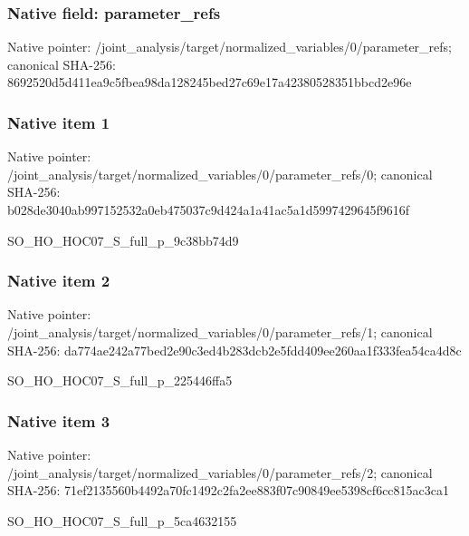 \documentclass[10pt,a4paper]{article}
\begin{document}
\subsubsection{Native field: parameter\_\allowbreak{}refs}
Native pointer: /joint\_\allowbreak{}analysis/target/normalized\_\allowbreak{}variables/0/parameter\_\allowbreak{}refs; canonical SHA-256: 8692520d5d411ea9c5fbea98da128245bed27c69e17a42380528351bbcd2e96e

\subsubsection{Native item 1}
Native pointer: /joint\_\allowbreak{}analysis/target/normalized\_\allowbreak{}variables/0/parameter\_\allowbreak{}refs/0; canonical SHA-256: b028de3040ab997152532a0eb475037c9d424a1a41ac5a1d5997429645f9616f

\begingroup\raggedright\sloppy SO\_\allowbreak{}HO\_\allowbreak{}HOC07\_\allowbreak{}S\_\allowbreak{}full\_\allowbreak{}p\_\allowbreak{}9c38bb74d9\par\endgroup

\subsubsection{Native item 2}
Native pointer: /joint\_\allowbreak{}analysis/target/normalized\_\allowbreak{}variables/0/parameter\_\allowbreak{}refs/1; canonical SHA-256: da774ae242a77bed2e90c3ed4b283dcb2e5fdd409ee260aa1f333fea54ca4d8c

\begingroup\raggedright\sloppy SO\_\allowbreak{}HO\_\allowbreak{}HOC07\_\allowbreak{}S\_\allowbreak{}full\_\allowbreak{}p\_\allowbreak{}225446ffa5\par\endgroup

\subsubsection{Native item 3}
Native pointer: /joint\_\allowbreak{}analysis/target/normalized\_\allowbreak{}variables/0/parameter\_\allowbreak{}refs/2; canonical SHA-256: 71ef2135560b4492a70fc1492c2fa2ee883f07c90849ee5398cf6cc815ac3ca1

\begingroup\raggedright\sloppy SO\_\allowbreak{}HO\_\allowbreak{}HOC07\_\allowbreak{}S\_\allowbreak{}full\_\allowbreak{}p\_\allowbreak{}5ca4632155\par\endgroup
\end{document}
